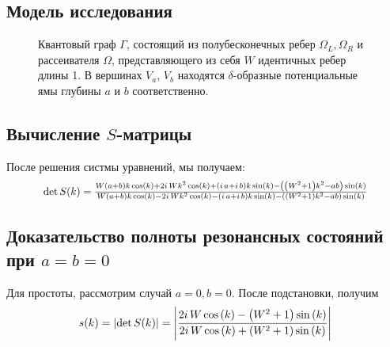 \subsection{Модель исследования}
\begin{figure}[!htb] %
\begin{tikzpicture}[scale=0.8] %

\end{tikzpicture}
\caption{Квантовый граф $\Gamma$, состоящий из полубесконечных ребер $\Omega_L, \Omega_R$ и рассеивателя $\Omega$, представляющего из себя $W$ идентичных ребер длины 1. В вершинах $V_a$, $V_b$ находятся $\delta$-образные потенциальные ямы глубины $a$ и $b$ соответственно.}
\end{figure}

\subsection{Вычисление $S$-матрицы}

После решения систмы уравнений, мы получаем: 
\begin{equation*}
\resizebox{0.85\hsize}{!}{$
\det S(k) = \frac{W {\left(a + b\right)} k \cos\left(k\right) + 2 i \, W k^{2} \cos\left(k\right) + {\left(i \, a + i \, b\right)} k \sin\left(k\right) - {\left({\left(W^{2} + 1\right)} k^{2} - a b\right)} \sin\left(k\right)}{W {\left(a + b\right)} k \cos\left(k\right) - 2 i \, W k^{2} \cos\left(k\right) - {\left(i \, a + i \, b\right)} k \sin\left(k\right) - {\left({\left(W^{2} + 1\right)} k^{2} - a b\right)} \sin\left(k\right)}
$}
\end{equation*}

\subsection{Доказательство полноты резонансных состояний при $a = b = 0$}
Для простоты, рассмотрим случай $a = 0, b = 0$. После подстановки, получим
\begin{equation}\label{eq:bundle_s}
s(k) = \abs{\det S(k)} = \abs{\frac{2 i \, W \cos\left(k\right) - {\left(W^{2} + 1\right)} \sin\left(k\right)}{2 i \, W \cos\left(k\right) + {\left(W^{2} + 1\right)} \sin\left(k\right)}}
\end{equation}


